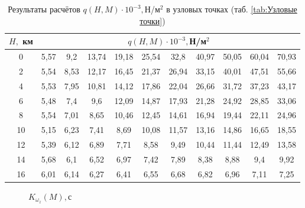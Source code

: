 \begin{table}[H]
    \centering
    \caption{Результаты расчётов $q(H,M) \cdot 10^{-3},$Н/м$^2$ в узловых точках (таб. \ref{tab:Узловые точки})}
    \label{tab:Результаты расчётов $q(H,M),$Н/м$^2$}
    \begin{tabular}{|c|c|c|c|c|c|c|c|c|c|c|}
    \hline
        $H,$ км &\multicolumn{10}{|c|}{$q(H,M) \cdot 10^{-3},$Н/м$^2$ }\\ \hline
        0 & 5,57 & 9,2 & 13,74 & 19,18 & 25,54 & 32,8 & 40,97 & 50,05 & 60,04 & 70,93  \\ \hline
        2 & 5,54 & 8,53 & 12,17 & 16,45 & 21,37 & 26,94 & 33,15 & 40,01 & 47,51 & 55,66  \\ \hline
        4 & 5,53 & 7,95 & 10,81 & 14,12 & 17,86 & 22,04 & 26,66 & 31,72 & 37,23 & 43,17  \\ \hline
        6 & 5,48 & 7,4 & 9,6 & 12,09 & 14,87 & 17,93 & 21,28 & 24,92 & 28,85 & 33,06  \\ \hline
        8 & 5,54 & 7,01 & 8,65 & 10,46 & 12,45 & 14,61 & 16,94 & 19,44 & 22,11 & 24,96  \\ \hline
        10 & 5,15 & 6,23 & 7,41 & 8,69 & 10,08 & 11,57 & 13,16 & 14,86 & 16,65 & 18,55  \\ \hline
        12 & 5,39 & 6,12 & 6,89 & 7,71 & 8,58 & 9,49 & 10,44 & 11,44 & 12,49 & 13,58  \\ \hline
        14 & 5,68 & 6,1 & 6,52 & 6,97 & 7,42 & 7,89 & 8,38 & 8,88 & 9,4 & 9,92  \\ \hline
        16 & 6,01 & 6,14 & 6,27 & 6,41 & 6,55 & 6,68 & 6,82 & 6,96 & 7,11 & 7,25  \\ \hline
    \end{tabular}
\end{table}
    
    \begin{figure}[H]
        \caption{$K_{\omega_z}(M), $с}
        \label{fig:K_wz}
    \end{figure}
    
